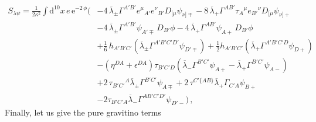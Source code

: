 \documentclass[a4paper,10pt,openany]{article}
\def\rme{\mathrm{e}}
\def\rmd{\mathrm{d}}
\begin{document}
	\begin{align} \label{eq:SNR3}
		S_{\lambda\psi} = \frac{1}{2\kappa^2}\int \rmd^{10}x \,e\,\rme^{-2\,\phi}\bigg(&-4\,\overline{\lambda}_{\pm}\Gamma^{A'B'}e^{\mu}{}_{A'}e^{\nu}{}_{B'}D_{[\mu}\psi_{\nu]\mp}-8\,\overline{\lambda}_{+}\Gamma^{AB'}\tau_A{}^{\mu}e_{B'}{}^{\nu}D_{[\mu}\psi_{\nu]+}\nonumber\\
		&-4\,\overline{\lambda}_{\pm}\Gamma^{A'B'}\psi_{A'\mp}\,D_{B'}\phi -4\,\overline{\lambda}_{+}\Gamma^{AB'}\psi_{A+}\,D_{B'}\phi \nonumber\\
		&+\frac{1}{6}\,h_{A'B'C'}(\overline{\lambda}_{\pm}\Gamma^{A'B'C'D'}\psi_{D'\mp})+\frac{1}{2}h_{A'B'C'}(\overline{\lambda}_{+}\Gamma^{A'B'C'D}\psi_{D+})\nonumber\\
		&-(\eta^{DA}+\epsilon^{DA})\tau_{B'C'D}(\overline{\lambda}_{-}\Gamma^{B'C'}\psi_{A+}-\overline{\lambda}_{+}\Gamma^{B'C'}\psi_{A-})\nonumber\\
		&+2\,\tau_{B'C'}{}^A\overline{\lambda}_{\pm}\Gamma^{B'C'}\psi_{A\mp} + 2\,\tau^{C'\{AB\}}\overline{\lambda}_{+}\Gamma_{C'A}\psi_{B+}\nonumber\\
		&-2\tau_{B'C'A}\overline{\lambda}_{-}\Gamma^{AB'C'D'}\psi_{D'-}\bigg)\,,
	\end{align}
	Finally, let us give the pure gravitino terms
\end{document}
